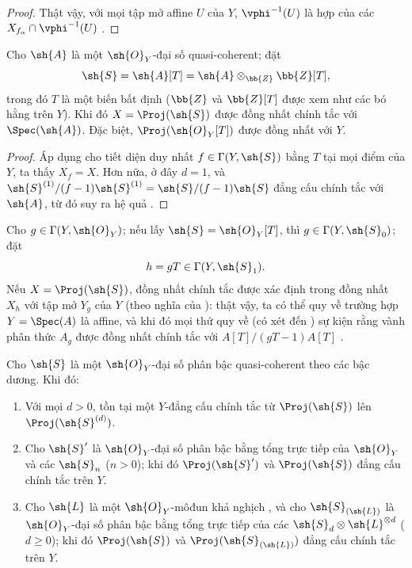 \documentclass[oneside,10pt]{amsart}
\renewcommand{\geq}{\geqslant}
\newcommand{\oldpage}[2][]{\marginnote{\normalfont\footnotesize\textbf{#1}~|~#2}\ignorespaces}
\let\EGAOriginalLabel\label
\renewcommand{\label}[1]{\phantomsection\EGAOriginalLabel{#1}}
\begin{document}
\begin{proof}
Thật vậy, với mọi tập mở affine $U$ của $Y$, $\vphi^{-1}(U)$ là hợp của các $X_{f_\alpha}\cap\vphi^{-1}(U)$ .
\end{proof}

\begin{corollary}[3.1.7]
\label{II.3.1.7}
Cho $\sh{A}$ là một $\sh{O}_Y$-đại số quasi-coherent;
đặt
\[
  \sh{S}=\sh{A}[T]=\sh{A}\otimes_{\bb{Z}}\bb{Z}[T],
\]
trong đó $T$ là một biến bất định ($\bb{Z}$ và $\bb{Z}[T]$ được xem như các bó hằng trên $Y$).
Khi đó $X=\Proj(\sh{S})$ được đồng nhất chính tắc với $\Spec(\sh{A})$.
Đặc biệt, $\Proj(\sh{O}_Y[T])$ được đồng nhất với $Y$.
\end{corollary}

\begin{proof}
Áp dụng  cho tiết diện duy nhất $f\in\Gamma(Y,\sh{S})$ bằng $T$ tại mọi điểm của $Y$, ta thấy $X_f=X$.
Hơn nữa, ở đây $d=1$, và $\sh{S}^{(1)}/(f-1)\sh{S}^{(1)}=\sh{S}/(f-1)\sh{S}$ đẳng cấu chính tắc với $\sh{A}$, từ đó suy ra hệ quả .
\end{proof}

Cho $g\in\Gamma(Y,\sh{O}_Y)$;
nếu lấy $\sh{S}=\sh{O}_Y[T]$, thì $g\in\Gamma(Y,\sh{S}_0)$;
đặt
\[
  h=gT\in\Gamma(Y,\sh{S}_1).
\]
Nếu $X=\Proj(\sh{S})$, đồng nhất chính tắc được xác định trong  đồng nhất $X_h$ với tập mở $Y_g$ của $Y$ (theo nghĩa của ):
thật vậy, ta có thể quy về trường hợp $Y=\Spec(A)$ là affine, và khi đó mọi thứ quy về (có xét đến ) sự kiện rằng vành phân thức $A_g$ được đồng nhất chính tắc với $A[T]/(gT-1)A[T]$ .

\begin{proposition}[3.1.8]
\label{II.3.1.8}
Cho $\sh{S}$ là một $\sh{O}_Y$-đại số phân bậc quasi-coherent theo các bậc dương.
Khi đó:
\begin{enumerate}
  \item[(i)] Với mọi $d>0$, tồn tại một $Y$-đẳng cấu chính tắc từ $\Proj(\sh{S})$ lên $\Proj(\sh{S}^{(d)})$.
\oldpage[II]{52}
  \item[(ii)] Cho $\sh{S}'$ là $\sh{O}_Y$-đại số phân bậc bằng tổng trực tiếp của $\sh{O}_Y$ và các $\sh{S}_n$ ($n>0$);
    khi đó $\Proj(\sh{S}')$ và $\Proj(\sh{S})$ đẳng cấu chính tắc trên $Y$.
  \item[(iii)] Cho $\sh{L}$ là một $\sh{O}_Y$-môđun khả nghịch , và cho $\sh{S}_{(\sh{L})}$ là $\sh{O}_Y$-đại số phân bậc bằng tổng trực tiếp của các $\sh{S}_d\otimes\sh{L}^{\otimes d}$ ($d\geq0$);
    khi đó $\Proj(\sh{S})$ và $\Proj(\sh{S}_{(\sh{L})})$ đẳng cấu chính tắc trên $Y$.
\end{enumerate}
\end{proposition}
\end{document}
